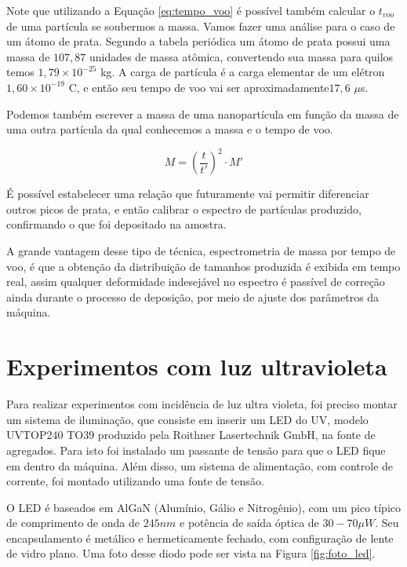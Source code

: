 Note que utilizando a Equação \ref{eq:tempo_voo} é possível também calcular o $t_{voo}$ de uma partícula se soubermos a massa. Vamos fazer uma análise para o caso de um átomo de prata. Segundo a tabela periódica um átomo de prata possui uma massa de $107,87$ unidades de massa atômica, convertendo sua massa para quilos temos $1,79\times 10^{-25}$ kg. A carga de partícula é a carga elementar de um elétron $1,60\times 10^{-19}$ C, e então seu tempo de voo vai ser aproximadamente$17,6$ $\mu$s.

Podemos também escrever a massa de uma nanopartícula em função da massa de uma outra partícula da qual conhecemos a massa e o tempo de voo.

\begin{equation}
\label{eq:relacao_massa_tempo}
M = \left(\frac{t}{t'}\right)^2 \cdot M'
\end{equation}


É possível estabelecer uma relação que futuramente vai permitir diferenciar outros picos de prata, e então calibrar o espectro de partículas produzido, confirmando o que foi depositado na amostra.


A grande vantagem desse tipo de técnica, espectrometria de massa por tempo de voo, é que a obtenção da distribuição de tamanhos produzida é exibida em tempo real, assim qualquer deformidade indesejável no espectro é passível de correção ainda durante o processo de deposição, por meio de ajuste  dos parâmetros da máquina. 

\section{Experimentos com luz ultravioleta}

Para realizar experimentos com incidência de luz ultra violeta, foi preciso montar um sistema de iluminação, que consiste em inserir um LED do UV, modelo UVTOP240 TO39 produzido pela Roithner Lasertechnik GmbH, na fonte de agregados. Para isto foi instalado um passante de tensão para que o LED fique em dentro da máquina. Além disso, um sistema de alimentação, com controle de corrente, foi montado utilizando uma fonte de tensão.

O LED é baseados em AlGaN (Alumínio, Gálio e Nitrogênio), com um pico típico de comprimento de onda de $245 nm$ e potência de saída óptica de $30-70 \mu W$. Seu encapsulamento é metálico e hermeticamente fechado, com configuração de lente de vidro plano. Uma foto desse diodo pode ser vista na Figura \ref{fig:foto_led}.

